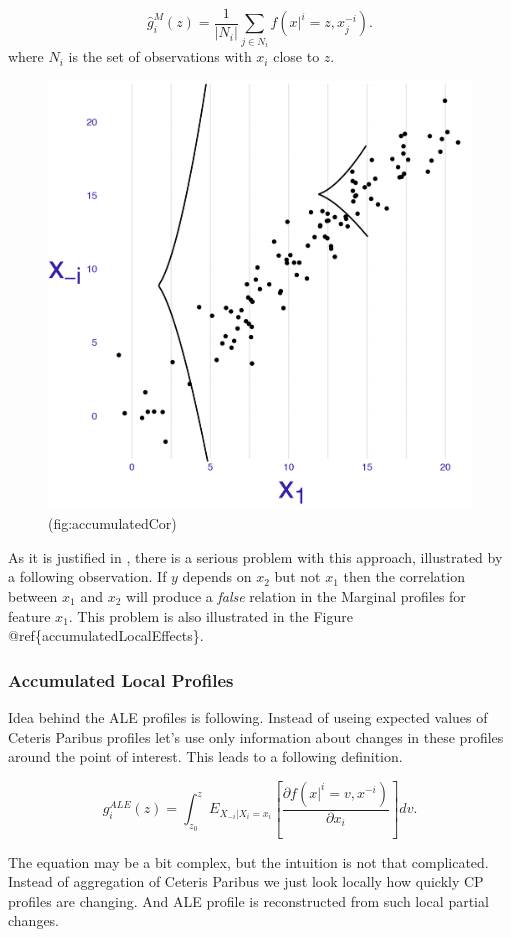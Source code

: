 \documentclass[]{krantz}
\theoremstyle{definition}
\theoremstyle{definition}
\theoremstyle{definition}
\theoremstyle{remark}
\begin{document}
\[
\hat g^{M}_i(z) = \frac{1}{|N_i|} \sum_{j\in N_i} f(x|^i = z, x_j^{-i}). 
\] where \(N_i\) is the set of observations with \(x_i\) close to \(z\).

\begin{figure}

{\centering \includegraphics[width=0.4\linewidth]{figure/CP_ALE_2} 

}

\caption{(fig:accumulatedCor) }\label{fig:accumulatedCor}
\end{figure}

As it is justified in \citep{R-ALEPlot}, there is a serious problem with
this approach, illustrated by a following observation. If \(y\) depends
on \(x_2\) but not \(x_1\) then the correlation between \(x_1\) and
\(x_2\) will produce a \emph{false} relation in the Marginal profiles
for feature \(x_1\). This problem is also illustrated in the Figure
@ref\{accumulatedLocalEffects\}.

\hypertarget{accumulated-local-profiles}{%
\subsubsection{Accumulated Local
Profiles}\label{accumulated-local-profiles}}

Idea behind the ALE profiles \citep{R-ALEPlot} is following. Instead of
useing expected values of Ceteris Paribus profiles let's use only
information about changes in these profiles around the point of
interest. This leads to a following definition.

\[
g^{ALE}_i(z) = \int_{z_0}^z E_{X_{-i}|X_i=x_i}\left[ \frac{\partial f(x|^i = v, x^{-i}) }{\partial x_i}\right] dv.
\]

The equation may be a bit complex, but the intuition is not that
complicated. Instead of aggregation of Ceteris Paribus we just look
locally how quickly CP profiles are changing. And ALE profile is
reconstructed from such local partial changes.
\end{document}
